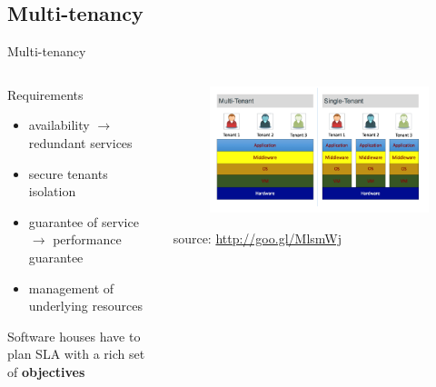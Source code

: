 \subsection{Multi-tenancy}
\begin{frame}{Multi-tenancy}
	\only<1>
	{
		\begin{columns}
			\begin{column}{0.6\textwidth}
				Requirements
				\begin{itemize}
					\item{\footnotesize{availability $\rightarrow{}$ redundant services}}
					\item{\footnotesize{secure tenants isolation}}
					\item{\footnotesize{guarantee of service $\rightarrow$ performance guarantee}}
					\item{\footnotesize{management of underlying resources}}
				\end{itemize}
				\begin{center}
					Software houses have to plan SLA with a rich set of \textbf{objectives}
				\end{center}
			\end{column}
			\begin{column}{0.4\textwidth}
				\begin{figure}
					\centering{}
					\includegraphics[scale=0.19]{images/multi-tenancy.png}
				\end{figure}
				\begin{flushright}
					\tiny{source: \url{http://goo.gl/MlsmWj}}
				\end{flushright}
			\end{column}
		\end{columns}
	}
	\only<2>
	{
		\begin{columns}
			\begin{column}{0.6\textwidth}

\end{column}
\end{columns}}
\end{frame}
